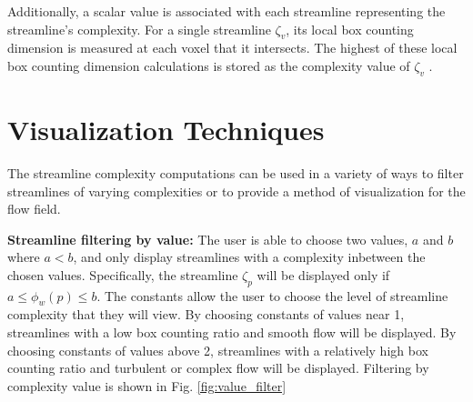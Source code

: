 \documentclass[journal]{vgtc}                %
\begin{document}
Additionally, a scalar value is associated with each streamline representing the streamline's complexity.
For a single streamline $\zeta_v$, its local box counting dimension is measured at each voxel that it intersects.
The highest of these local box counting dimension calculations is stored as the complexity value of $\zeta_v$ .

\section{Visualization Techniques}

The streamline complexity computations can be used in a variety of ways to filter streamlines of varying complexities or to provide a method of visualization for the flow field.

\textbf{Streamline filtering by value:}
The user is able to choose two values, $a$ and $b$ where $a < b$, and only display streamlines with a complexity inbetween the chosen values. 
Specifically, the streamline $\zeta_p$ will be displayed only if $a \leq \phi_w(p) \leq b$.
The constants allow the user to choose the level of streamline complexity that they will view.
By choosing constants of values near 1, streamlines with a low box counting ratio and smooth flow will be displayed.
By choosing constants of values above 2, streamlines with a relatively high box counting ratio and turbulent or complex flow will be displayed.
Filtering by complexity value is shown in Fig. \ref{fig:value_filter}
\end{document}
